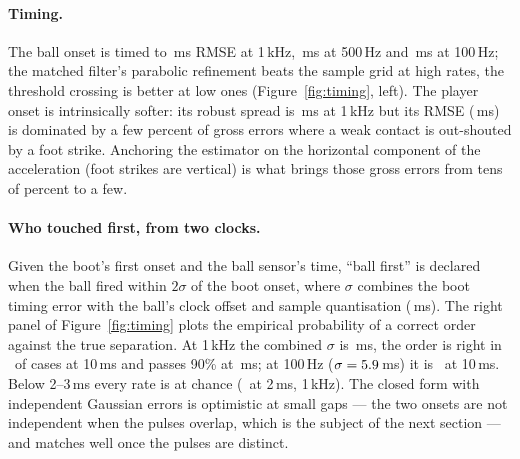 \paragraph{Timing.} The ball onset is timed to \TimBallOneK\,ms RMSE at
1\,kHz, \TimBallFiveH\,ms at 500\,Hz and \TimBallHundred\,ms at 100\,Hz; the
matched filter's parabolic refinement beats the sample grid at high rates,
the threshold crossing is better at low ones (Figure~\ref{fig:timing}, left).
The player onset is intrinsically softer: its robust spread is
\TimPlayerMadOneK\,ms at 1\,kHz but its RMSE (\TimPlayerOneK\,ms) is
dominated by a few percent of gross errors where a weak contact is out-shouted
by a foot strike. Anchoring the estimator on the horizontal component of the
acceleration (foot strikes are vertical) is what brings those gross errors from
tens of percent to a few.

\paragraph{Who touched first, from two clocks.} Given the boot's first onset
and the ball sensor's time, ``ball first'' is declared when the ball fired
within $2\sigma$ of the boot onset, where $\sigma$ combines the boot timing
error with the ball's clock offset and sample quantisation (\OrdSigmaBall\,ms).
The right panel of Figure~\ref{fig:timing} plots the empirical probability of a
correct order against the true separation. At 1\,kHz the combined
$\sigma$ is \OrdSigmaOneK\,ms, the order is right in \OrdPTenOneK\ of cases at
10\,ms and passes 90\% at \OrdGapNinetyOneK\,ms; at 100\,Hz
($\sigma=5.9$\,ms) it is \OrdPTenHundred\ at 10\,ms. Below
2--3\,ms every rate is at chance (\OrdPTwoOneK\ at 2\,ms, 1\,kHz). The closed
form with independent Gaussian errors is optimistic at small gaps --- the two
onsets are not independent when the pulses overlap, which is the subject of
the next section --- and matches well once the pulses are distinct.
